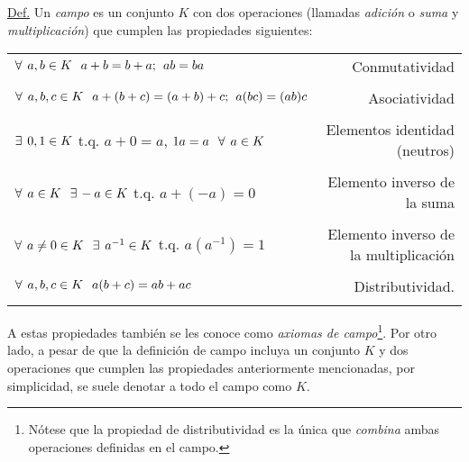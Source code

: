 \documentclass[12pt,dvipsnames]{article}
\begin{document}
\begin{tcolorbox}
\underline{Def.} Un \emph{campo} es un conjunto $K$ con dos operaciones (llamadas \emph{adición} o \emph{suma} y \emph{multiplicación}) que cumplen las propiedades siguientes:

\begin{center}
\begin{tabular}{lr}
    \\
    $\forall\hspace{1.5mm}a,b\in K\hspace{2.5mm} a+b=b+a;\hspace{1.5mm} ab = ba
    $ & Conmutatividad \\ \\
    $\forall\hspace{1.5mm}a,b,c\in K\hspace{2.5mm}a+(b+c)=(a+b)+c;\hspace{1.5mm}a(bc)=(ab)c$ & Asociatividad \\ \\
    $\exists\hspace{1.5mm} 0,1\in K$ t.q. $a+0=a$, $1a=a\hspace{2.5mm} \forall\hspace{1.5mm}a \in K$ & Elementos identidad (neutros) \\ \\
    $\forall\hspace{1.5mm}a\in K\hspace{2.5mm}\exists\hspace{0.5mm}-a\in K$ t.q. $a + (-a) = 0$ & Elemento inverso de la suma \\ \\
    $\forall\hspace{1.5mm}a\neq0\in K \hspace{2.5mm} \exists\hspace{1.5mm}a^{-1}\in K$ t.q. $a(a^{-1})= 1$ & Elemento inverso de la multiplicación \\ \\
    $\forall\hspace{1.5mm}a,b,c\in K\hspace{2.5mm}a(b+c) = ab+ac$ & Distributividad.\\ \\
\end{tabular}
\end{center}

\noindent A estas propiedades también se les conoce como \emph{axiomas de campo}\footnote{Nótese que la propiedad de distributividad es la única que \emph{combina} ambas operaciones definidas en el campo.}. Por otro lado, a pesar de que la definición de campo incluya un conjunto $K$ y dos operaciones que cumplen las propiedades anteriormente mencionadas, por simplicidad, se suele denotar a todo el campo como $K$.
\end{tcolorbox}
\end{document}
